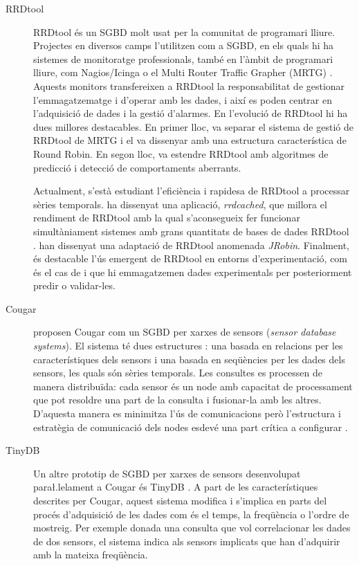 \begin{description}
\item[RRDtool]
RRDtool \parencite{rrdtool} {é}s un SGBD molt usat per la comunitat de programari lliure. Projectes en diversos camps l'utilitzen com a SGBD, en els quals hi ha sistemes de monitoratge professionals, també en l'àmbit de programari lliure, com Nagios/Icinga \parencite{nagios,icinga} o el Multi Router Traffic Grapher (MRTG) \parencite{mrtg}. Aquests monitors transfereixen a RRDtool la responsabilitat de gestionar l'emmagatzematge i d'operar amb les dades, i així es poden centrar en l'adquisició de dades i la gestió d'alarmes. 
En l'evolució de RRDtool hi ha dues millores destacables. En primer lloc, \textcite{lisa98:oetiker} va separar el sistema de gestió de RRDtool de MRTG i el va dissenyar amb una estructura característica de Round Robin. En segon lloc,  \textcite{lisa00:brutlag} va estendre RRDtool amb algoritmes de predicció i detecció de comportaments aberrants. 

Actualment, s'està estudiant l'eficiència i rapidesa de RRDtool a processar sèries temporals. \textcite{carder:rrdcached} ha dissenyat una aplicació, \emph{rrdcached}, que millora el rendiment de RRDtool amb la qual s'aconsegueix fer funcionar  simultàniament sistemes amb grans quantitats de bases de dades RRDtool \parencite{lisa07:plonka}. \textcite{jrobin} han dissenyat una adaptació de RRDtool anomenada \emph{JRobin}. 
Finalment, és destacable l'ús emergent de RRDtool en entorns d'experimentació, com és el cas de \textcite{zhang07} i \textcite{chilingaryan10} que hi emmagatzemen dades experimentals per posteriorment predir o validar-les.


\item[Cougar]
\textcite{cougar} proposen Cougar com un SGBD per xarxes de sensors (\emph{sensor database systems}). El sistema té dues estructures \parencite{bonnet01}: una basada en relacions per les característiques dels sensors i una basada en seqüències per les dades dels sensors, les quals són sèries temporals.
Les consultes es processen de manera distribuïda: cada sensor és un node amb capacitat de processament que pot resoldre una part de la consulta i fusionar-la amb les altres. D'aquesta manera es minimitza l'ús de comunicacions però l'estructura i estratègia de comunicació dels nodes esdevé una part crítica a configurar \parencite{demers03}.

\item[TinyDB]
Un altre prototip de SGBD per xarxes de sensors desenvolupat para\l.lelament a Cougar és TinyDB \parencite{tinyDB}. A part de les característiques descrites per Cougar, aquest sistema  modifica i s'implica en parts del procés d'adquisició de les dades com és el temps, la freqüència o l'ordre de mostreig. Per exemple donada una consulta que vol correlacionar les dades de dos sensors, el sistema indica als sensors implicats que han d'adquirir amb la mateixa freqüència.


\end{description}
